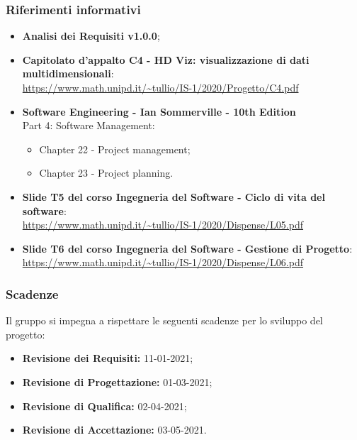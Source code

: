 \subsubsection{Riferimenti informativi}
\begin{itemize}
	\item \textbf{Analisi dei Requisiti v1.0.0};
	
	\item \textbf{Capitolato d'appalto C4 - HD Viz: visualizzazione di dati multidimensionali}:\\
	\textcolor{blue}{\url{https://www.math.unipd.it/~tullio/IS-1/2020/Progetto/C4.pdf}}
	
	\item \textbf{Software Engineering - Ian Sommerville - 10th Edition}\\ Part 4: Software Management:
	\begin{itemize}
	\item Chapter 22 - Project management;
	\item Chapter 23 - Project planning.
	\end{itemize}		 
	
	\item \textbf{Slide T5 del corso Ingegneria del Software - Ciclo di vita del software}:\\
	\textcolor{blue}{\url{https://www.math.unipd.it/~tullio/IS-1/2020/Dispense/L05.pdf}}
	
	\item \textbf{Slide T6 del corso Ingegneria del Software - Gestione di Progetto}:\\
	\textcolor{blue}{\url{https://www.math.unipd.it/~tullio/IS-1/2020/Dispense/L06.pdf}}
\end{itemize}

\subsubsection{Scadenze}
Il gruppo \Gruppo{} si impegna a rispettare le seguenti scadenze per lo sviluppo del progetto:
\begin{itemize}
\item \textbf{Revisione dei Requisiti:} 11-01-2021;
\item \textbf{Revisione di Progettazione:} 01-03-2021;
\item \textbf{Revisione di Qualifica:} 02-04-2021;
\item \textbf{Revisione di Accettazione:} 03-05-2021.
\end{itemize}


